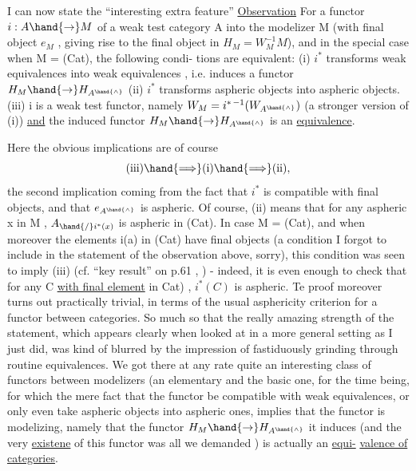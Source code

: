 
I can now state the ``interesting extra feature'' 
\uline{Observation} For a functor $i: A\hand{\to} M$ of a weak test category A into the
modelizer M (with final object $e_M$ , giving rise to the final object in
$H_M = W_M^{-1}M$), and in the special case when M = (Cat), the following condi-%
tions are equivalent:
(i) $i^*$ transforms weak equivalences into weak equivalences , i.e.
induces a functor  $H_M\hand{\to} H_{A^{\hand{\wedge}}}$
(ii) $i^*$ transforms aspheric objects into aspheric objects.
(iii) i is a weak test functor, namely $W_M = i^{*\,-1}(W_{A^{\hand{\wedge}}})$ (a stronger
version of (i)) \uline{and} the induced functor $H_M\hand{\to} H_{A^{\hand{\wedge}}}$ is an
\uline{equivalence}.

Here the obvious implications are of course
\[ \text{(iii)} \hand{\Longrightarrow} \text{(i)} \hand{\Longrightarrow} \text{(ii)} , \]
the second implic\hand{\ensuremath{\smile}}ation coming from the fact that $i^*$ is compatible with
final objects, and that $e_{A^{\hand{\wedge}}}$ is aspheric. Of course, (ii) means that
for any aspheric x in M , $A_{\hand{/}i^*(x)}$ is aspheric in (Cat). In case M =
(Cat), and when moreover the elements i(a) in (Cat) have final objects
(a condition I forgot to include in the statement of the observation
above, sorry), this condition was seen to imply (iii) (cf. ``key result''
on p.61 , ) - indeed, it is even enough to check that
 for any C \uline{with final element} in \hand{(}Cat) , $i^*(C)$ is aspheric. Te proof
moreover turns out practically trivial, in terms of the usual asphericity
criterion for a functor between categories. So much so that the really
amazing strength of the statement, which appears clearly when looked at
in a more general setting\xout{\unsure{,}} as I just did, was kind of blurred by the
impression of  fastiduously grinding through routine equivalences. We got
 there at any rate quite an interesting class of functors between modelizers
(an elementary and the basic one, for the time being\hand{)}, for which the
mere fact that the functor be compatible with weak equivalences, or only
even take aspheric objects into aspheric ones, implies that the functor
is modelizing, namely that the functor $H_M\hand{\to} H_{A^{\hand{\wedge}}}$ it induces (and the
very \uline{existene} of this functor was all we demanded ) is actually an \uline{equi-}%
\uline{valence of categories}.

